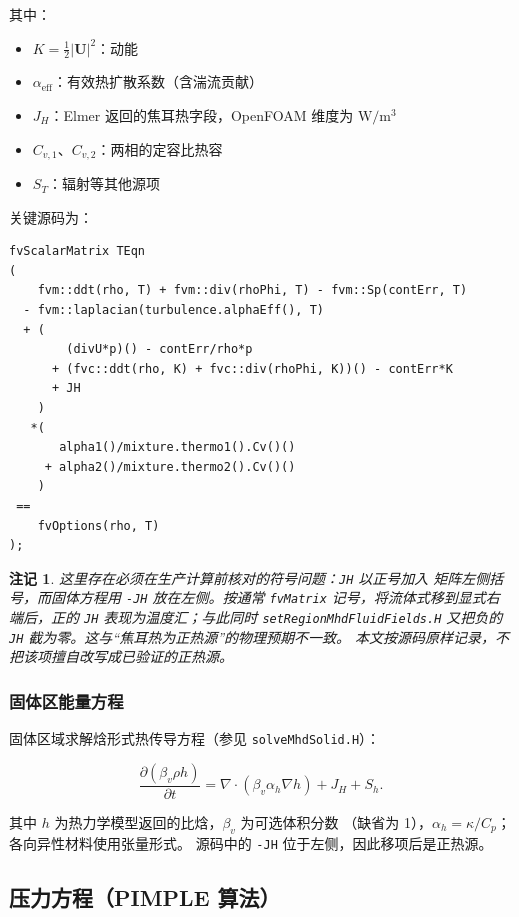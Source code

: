 \documentclass[11pt,a4paper]{article}
\newtheorem{remark}{注记}[section]
\begin{document}
其中：
\begin{itemize}
    \item $K = \frac{1}{2}|\mathbf{U}|^2$：动能
    \item $\alpha_{\text{eff}}$：有效热扩散系数（含湍流贡献）
    \item $J_H$：Elmer 返回的焦耳热字段，OpenFOAM 维度为 $\mathrm{W/m^3}$
    \item $C_{v,1}$、$C_{v,2}$：两相的定容比热容
    \item $S_T$：辐射等其他源项
\end{itemize}

关键源码为：

\begin{lstlisting}[style=cppstyle]
fvScalarMatrix TEqn
(
    fvm::ddt(rho, T) + fvm::div(rhoPhi, T) - fvm::Sp(contErr, T)
  - fvm::laplacian(turbulence.alphaEff(), T)
  + (
        (divU*p)() - contErr/rho*p
      + (fvc::ddt(rho, K) + fvc::div(rhoPhi, K))() - contErr*K
      + JH
    )
   *(
       alpha1()/mixture.thermo1().Cv()()
     + alpha2()/mixture.thermo2().Cv()()
    )
 ==
    fvOptions(rho, T)
);
\end{lstlisting}

\begin{remark}
这里存在必须在生产计算前核对的符号问题：\texttt{JH} 以正号加入
矩阵左侧括号，而固体方程用 \texttt{-JH} 放在左侧。按通常
\texttt{fvMatrix} 记号，将流体式移到显式右端后，正的 \texttt{JH}
表现为温度汇；与此同时 \texttt{setRegionMhdFluidFields.H} 又把负的
\texttt{JH} 截为零。这与“焦耳热为正热源”的物理预期不一致。
本文按源码原样记录，不把该项擅自改写成已验证的正热源。
\end{remark}

\subsubsection{固体区能量方程}

固体区域求解焓形式热传导方程（参见 \texttt{solveMhdSolid.H}）：

\begin{equation}
\frac{\partial (\beta_v\rho h)}{\partial t}
=\nabla\cdot(\beta_v\alpha_h\nabla h)+J_H+S_h .
\label{eq:solidEnergy}
\end{equation}

其中 $h$ 为热力学模型返回的比焓，$\beta_v$ 为可选体积分数
（缺省为 1），$\alpha_h=\kappa/C_p$；各向异性材料使用张量形式。
源码中的 \texttt{-JH} 位于左侧，因此移项后是正热源。

\subsection{压力方程（PIMPLE 算法）}
\end{document}
